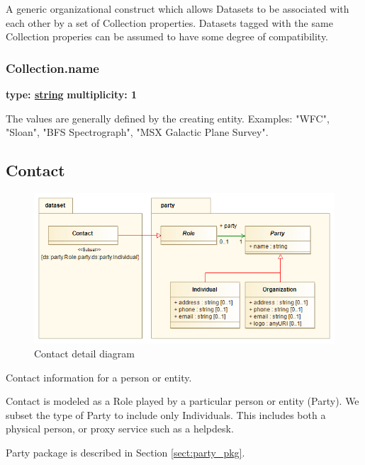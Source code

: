   A generic organizational construct which allows Datasets to be associated with
  each other by a set of Collection properties. Datasets tagged with the same
  Collection properies can be assumed to have some degree of compatibility.

  \subsubsection{Collection.name}
  \textbf{type: \hyperref[sect:ivoa]{string}} \newline
  \textbf{multiplicity: 1} \newline 

  The values are generally defined by the creating entity. Examples: "WFC",
  "Sloan", "BFS Spectrograph", "MSX Galactic Plane Survey".

  
\pagebreak
\subsection{Contact}
\label{sect:contact}

  \begin{figure}[h]
  \begin{center}
    \includegraphics[width=4.75in]{diagrams/Contact.png}
    \caption{Contact detail diagram}\label{fig:contact}
  \end{center}
  \end{figure}

  Contact information for a person or entity.
  
  Contact is modeled as a Role played by a particular person or entity (Party).
  We subset the type of Party to include only Individuals. This includes both a
  physical person, or proxy service such as a helpdesk.
  
  Party package is described in Section \ref{sect:party_pkg}.
  

\pagebreak
